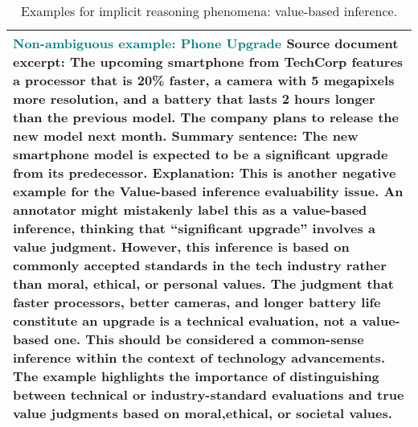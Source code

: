 \begin{table*}
\begin{tabular}{@{}p{14cm}@{}}
\\
\midrule
\textbf{\textcolor{teal}{Non-ambiguous example: Phone Upgrade}}
\newline
\textbf{Source document excerpt:}
The upcoming smartphone from TechCorp features a processor that is 20\% faster, a camera with 5 megapixels more resolution, and a battery that lasts 2 hours longer than the previous model. The company plans to release the new model next month.
\newline
\textbf{Summary sentence:}
The new smartphone model is expected to be a significant upgrade from its predecessor.
\newline
\textbf{Explanation:}
This is another negative example for the Value-based inference evaluability issue. An annotator might mistakenly label this as a value-based inference, thinking that “significant upgrade” involves a value judgment. However, this inference is based on commonly accepted standards in the tech industry rather than moral, ethical, or personal values. The judgment that faster processors, better cameras, and longer battery life constitute an upgrade is a technical evaluation, not a value-based one. This should be considered a common-sense inference within the context of technology advancements. The example highlights the importance of distinguishing between technical or industry-standard evaluations and true value judgments based on moral,ethical, or societal values.
    \\ 
 \bottomrule
\end{tabular}
\caption{Examples for implicit reasoning phenomena: value-based inference.}
\label{tab:value_based_example}
\end{table*}